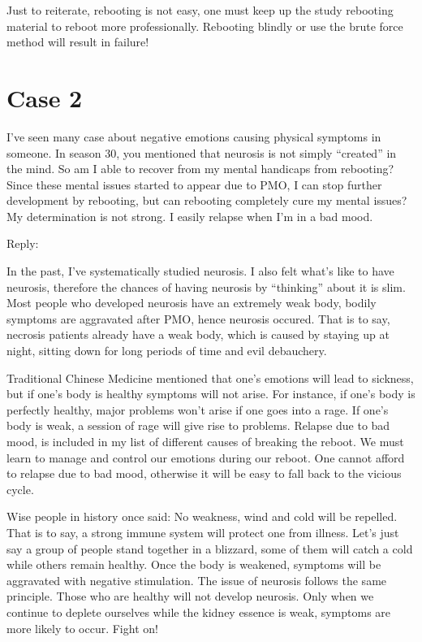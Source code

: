\documentclass[
]{book}
\begin{document}
Just to reiterate, rebooting is not easy, one must keep up the study rebooting material to reboot more professionally. Rebooting blindly or use the brute force method will result in failure!

\hypertarget{case-2-2}{%
\section{Case 2}\label{case-2-2}}

I've seen many case about negative emotions causing physical symptoms in someone. In season 30, you mentioned that neurosis is not simply ``created'' in the mind. So am I able to recover from my mental handicaps from rebooting? Since these mental issues started to appear due to PMO, I can stop further development by rebooting, but can rebooting completely cure my mental issues? My determination is not strong. I easily relapse when I'm in a bad mood.

Reply:

In the past, I've systematically studied neurosis. I also felt what's like to have neurosis, therefore the chances of having neurosis by ``thinking'' about it is slim. Most people who developed neurosis have an extremely weak body, bodily symptoms are aggravated after PMO, hence neurosis occured. That is to say, necrosis patients already have a weak body, which is caused by staying up at night, sitting down for long periods of time and evil debauchery.

Traditional Chinese Medicine mentioned that one's emotions will lead to sickness, but if one's body is healthy symptoms will not arise. For instance, if one's body is perfectly healthy, major problems won't arise if one goes into a rage. If one's body is weak, a session of rage will give rise to problems. Relapse due to bad mood, is included in my list of different causes of breaking the reboot. We must learn to manage and control our emotions during our reboot. One cannot afford to relapse due to bad mood, otherwise it will be easy to fall back to the vicious cycle.

Wise people in history once said: No weakness, wind and cold will be repelled. That is to say, a strong immune system will protect one from illness. Let's just say a group of people stand together in a blizzard, some of them will catch a cold while others remain healthy. Once the body is weakened, symptoms will be aggravated with negative stimulation. The issue of neurosis follows the same principle. Those who are healthy will not develop neurosis. Only when we continue to deplete ourselves while the kidney essence is weak, symptoms are more likely to occur. Fight on!
\end{document}
